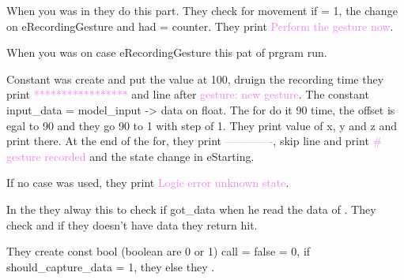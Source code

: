 \begin{center}
    \label{Magic Wand function}
\end{center}

When you was in  they do this part. They check for movement if  = 1, the  change on eRecordingGesture and had  = counter. They print \textcolor{violet}{Perform the gesture now}.

\begin{center}
    \label{Magic Wand function}
\end{center}

When you was on case eRecordingGesture this pat of prgram run. 

Constant  was create and put the value at 100, druign the recording time they print \textcolor{violet}{*****************} and line after \textcolor{violet}{gesture: new gesture}. 
The constant input\_data = model\_input -> data on float.
The for do it 90 time, the offset is egal to 90 and they go 90 to 1 with step of 1. They print value of x, y and z and print there. 
At the end of the for, they print \textcolor{violet}{-------------}, skip line and print \textcolor{violet}{\# gesture recorded} and the state change in eStarting. 

If no case was used, they print \textcolor{violet}{Logic error unknown state}.

\begin{center}
    \label{Code:Magic Wand function}
\end{center}

In the  they alway this to check if got\_data when he read the data of . They check and if they doesn't have data they return hit. 

They create const bool (boolean are 0 or 1)  call  = false = 0, if should\_capture\_data = 1, they  else they . 

